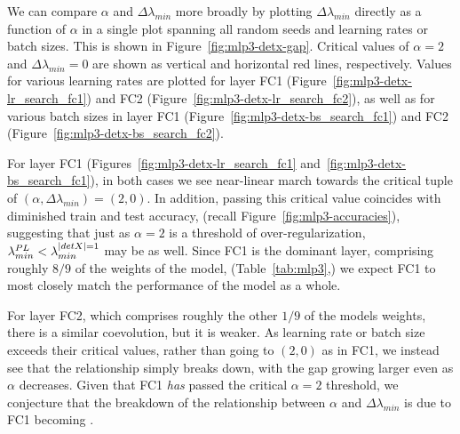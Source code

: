We can compare  $\alpha$ and $\Delta \lambda_{min}$ more broadly by plotting $\Delta \lambda_{min}$ directly as a function of $\alpha$ in a single plot spanning all random seeds and learning rates or batch sizes.
This is shown in Figure~\ref{fig:mlp3-detx-gap}. 
Critical values of $\alpha=2$ and $\Delta \lambda_{min} = 0$ are shown as vertical and horizontal red lines, respectively. 
Values for various learning rates are plotted for layer FC1 
(Figure~\ref{fig:mlp3-detx-lr_search_fc1}) and FC2 (Figure~\ref{fig:mlp3-detx-lr_search_fc2}), as well as for various batch sizes in layer FC1 (Figure~\ref{fig:mlp3-detx-bs_search_fc1}) and FC2 (Figure~\ref{fig:mlp3-detx-bs_search_fc2}).

For layer FC1 (Figures~\ref{fig:mlp3-detx-lr_search_fc1} and~\ref{fig:mlp3-detx-bs_search_fc1}), in both cases we see near-linear march towards the critical tuple of $(\alpha, \Delta\lambda_{min}) = (2, 0)$.
In addition, passing this critical value coincides with diminished train and test accuracy, (recall 
Figure~\ref{fig:mlp3-accuracies}), suggesting that just as $\alpha=2$ is a threshold of over-regularization, $\lambda^{PL}_{min} < \lambda^{\vert detX\vert=1}_{min}$ may be as well. 
Since FC1 is the dominant layer, comprising roughly $8/9$ of the weights of the model, (Table~\ref{tab:mlp3},) we expect 
FC1 to most closely match the performance of the model as a whole.

For layer FC2, which comprises roughly the other $1/9$ of the models weights, there is a similar coevolution, but it is weaker. 
As learning rate or batch size exceeds their critical values, rather than going to $(2, 0)$ as in FC1, we instead see that the relationship simply breaks down, with the gap growing larger even as $\alpha$ decreases. 
Given that FC1 \emph{has} passed the critical $\alpha=2$ threshold, we conjecture that the breakdown of the relationship between $\alpha$ and $\Delta \lambda_{min}$ is due to FC1 becoming \ATypical.


